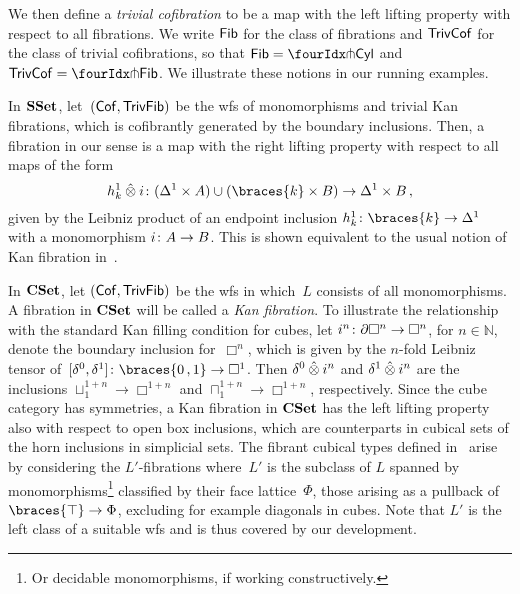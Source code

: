 \documentclass[reqno,10pt,a4paper,oneside,draft]{amsart}
\begin{document}
We then define a \emph{trivial cofibration} to be a map with the left lifting property with respect to all fibrations.
We write $\mathsf{Fib}$ for the class of fibrations and $\mathsf{TrivCof}$ for the class of trivial cofibrations, so that $\Fib = \liftr{\Cyl}$ and $\TrivCof = \liftl{\Fib}$.
We illustrate these notions in our running examples.

\begin{example} \label{thm:fib-is-kan}
In $\mathbf{SSet}$, let~$(\mathsf{Cof}, \mathsf{TrivFib})$ be the wfs of monomorphisms and trivial Kan fibrations, which is cofibrantly generated by the boundary inclusions.
Then, a fibration in our sense is a map with the right lifting property with respect to all maps of the form
\[
h_k^1 \hatotimes i \co (\Delta^1 \times A) \cup (\braces{k} \times B) \to \Delta^1 \times B
\, ,\]
given by the Leibniz product of an endpoint inclusion $h_k^1 \co \braces{k} \to \Delta^1$ with a monomorphism $i \colon A \to B$.
This is shown equivalent to the usual notion of Kan fibration in~\cite[Chap.~IV, Sec.~2]{gabriel-zisman:calculus-of-fractions}.
\end{example}

\begin{example} \label{nonalgebraic-cof}
In $\mathbf{CSet}$, let $(\mathsf{Cof}, \mathsf{TrivFib})$ be the wfs in which~$L$ consists of all monomorphisms.
A fibration in $\mathbf{CSet}$ will be called a \emph{Kan fibration}.
To illustrate the relationship with the standard Kan filling condition for cubes, let $i^n \colon \partial \Box^n \to \Box^n$, for $n \in \mathbb{N}$, denote the boundary inclusion for~$\Box^n$, which is given by the $n$-fold Leibniz tensor of~$[\lcyl, \rcyl] \co \braces{0\,, 1} \to \Box^1$.
Then $\delta^0 \mathbin{\hat{\otimes}} i^n$ and $\delta^1 \mathbin{\hat{\otimes}} i^n$ are the inclusions $\sqcup_1^{1+n} \to \Box^{1+n}$ and $\sqcap_1^{1+n} \to \Box^{1+n}$, respectively.
Since the cube category has symmetries, a Kan fibration in $\mathbf{CSet}$ has the left lifting property also with respect to open box inclusions, which are counterparts in cubical sets of the horn inclusions in simplicial sets.
The fibrant cubical types defined in~\cite{cohen-et-al:cubicaltt} arise by considering the $L'$-fibrations where~$L'$ is the subclass of $L$ spanned by monomorphisms\footnote{Or decidable monomorphisms, if working constructively.} classified by their face lattice~$\Phi$, \ie those arising as a pullback of $\braces{\top} \to \Phi$, excluding for example diagonals in cubes.
Note that $L'$ is the left class of a suitable wfs and is thus covered by our development.
\end{example}
\end{document}
